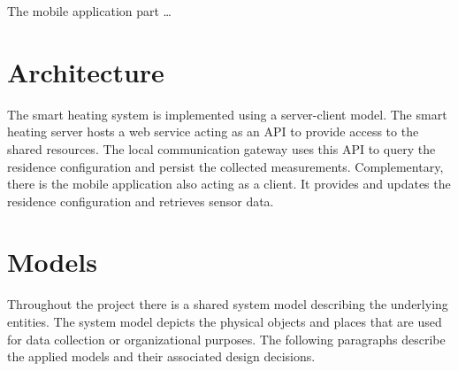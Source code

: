 The mobile application part \dots
{}

\section{Architecture}

The smart heating system is implemented using a server-client model.
The smart heating server hosts a web service acting as an API to provide access to the shared resources.
The local communication gateway uses this API to query the residence configuration and persist the collected measurements.
Complementary, there is the mobile application also acting as a client.
It provides and updates the residence configuration and retrieves sensor data.




\section{Models}
\label{sec:system_overview_models}

Throughout the project there is a shared system model describing the underlying entities. The system model depicts the physical objects and places that are used for data collection or organizational purposes. The following paragraphs describe the applied models and their associated design decisions.

